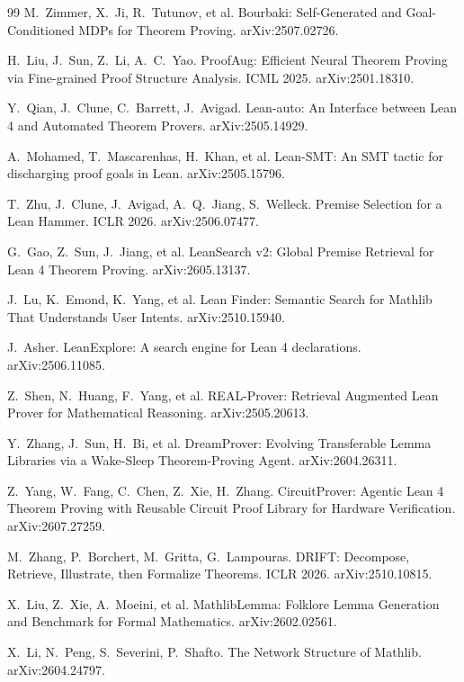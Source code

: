 \documentclass[UTF8,a4paper,11pt,fontset=windows]{ctexart}
\begin{document}
\begin{thebibliography}{99}
 M.~Zimmer, X.~Ji, R.~Tutunov, et al. Bourbaki: Self-Generated and Goal-Conditioned MDPs for Theorem Proving. arXiv:2507.02726.

 H.~Liu, J.~Sun, Z.~Li, A.~C.~Yao. ProofAug: Efficient Neural Theorem Proving via Fine-grained Proof Structure Analysis. ICML 2025. arXiv:2501.18310.

 Y.~Qian, J.~Clune, C.~Barrett, J.~Avigad. Lean-auto: An Interface between Lean 4 and Automated Theorem Provers. arXiv:2505.14929.

 A.~Mohamed, T.~Mascarenhas, H.~Khan, et al. Lean-SMT: An SMT tactic for discharging proof goals in Lean. arXiv:2505.15796.

 T.~Zhu, J.~Clune, J.~Avigad, A.~Q.~Jiang, S.~Welleck. Premise Selection for a Lean Hammer. ICLR 2026. arXiv:2506.07477.

 G.~Gao, Z.~Sun, J.~Jiang, et al. LeanSearch v2: Global Premise Retrieval for Lean 4 Theorem Proving. arXiv:2605.13137.

 J.~Lu, K.~Emond, K.~Yang, et al. Lean Finder: Semantic Search for Mathlib That Understands User Intents. arXiv:2510.15940.

 J.~Asher. LeanExplore: A search engine for Lean 4 declarations. arXiv:2506.11085.

 Z.~Shen, N.~Huang, F.~Yang, et al. REAL-Prover: Retrieval Augmented Lean Prover for Mathematical Reasoning. arXiv:2505.20613.

 Y.~Zhang, J.~Sun, H.~Bi, et al. DreamProver: Evolving Transferable Lemma Libraries via a Wake-Sleep Theorem-Proving Agent. arXiv:2604.26311.

 Z.~Yang, W.~Fang, C.~Chen, Z.~Xie, H.~Zhang. CircuitProver: Agentic Lean 4 Theorem Proving with Reusable Circuit Proof Library for Hardware Verification. arXiv:2607.27259.

 M.~Zhang, P.~Borchert, M.~Gritta, G.~Lampouras. DRIFT: Decompose, Retrieve, Illustrate, then Formalize Theorems. ICLR 2026. arXiv:2510.10815.

 X.~Liu, Z.~Xie, A.~Moeini, et al. MathlibLemma: Folklore Lemma Generation and Benchmark for Formal Mathematics. arXiv:2602.02561.

 X.~Li, N.~Peng, S.~Severini, P.~Shafto. The Network Structure of Mathlib. arXiv:2604.24797.


\end{thebibliography}
\end{document}
